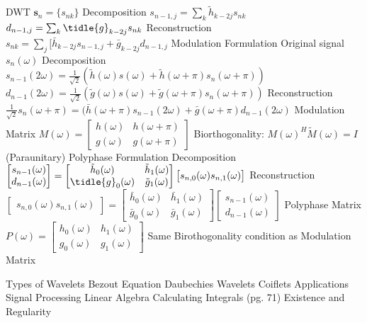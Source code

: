 \documentclass[14pt]{extarticle}
\begin{document}
\begin{outline}
			\2	DWT
				\3	$\mathbf{s}_n = \{s_{nk}\}$
				\3	Decomposition
					\4	$s_{n-1,j} = \sum_k \tilde{h}_{k - 2j} s_{nk}$
					\4	$d_{n-1,j} = \sum_k \tidle{g}_{k - 2j} s_{nk}$
				\3	Reconstruction
					\4	$s_{nk} = \sum_j [\bar{h}_{k - 2j} s_{n-1,j} + \bar{g}_{k-2j}d_{n-1,j}$
			\2	Modulation Formulation
				\3	Original signal $s_n(\omega)$
				\3	Decomposition
					\4	$s_{n-1}(2\omega) = \frac{1}{\sqrt{2}}(\tilde{h}(\omega)s(\omega) + 
								\tilde{h}(\omega + \pi) s_n(\omega + \pi))$
					\4	$d_{n-1}(2\omega) = \frac{1}{\sqrt{2}}(\tilde{g}(\omega)s(\omega) + 
								\tilde{g}(\omega + \pi) s_n(\omega + \pi))$
				\3	Reconstruction
					\4	$\frac{1}{\sqrt{2}}s_n(\omega + \pi) = (\bar{h}(\omega + \pi)s_{n-1}(2\omega) +
								\bar{g}(\omega + \pi) d_{n-1}(2\omega)$
				\3	Modulation Matrix
					\4	$M(\omega) = \begin{bmatrix}
															h(\omega) & h(\omega + \pi) \\
															g(\omega) & g(\omega + \pi)
														\end{bmatrix}$
					\4 Biorthogonality: $M(\omega)^H \tilde{M}(\omega) = I$ (Paraunitary)
			\2	Polyphase Formulation
				\3	Decomposition
					\4	$\begin{bmatrix} s_{n-1}(\omega) \\ d_{n-1}(\omega) \end{bmatrix}
								= \begin{bmatrix}
										\tilde{h}_0(\omega) & \tilde{h}_1(\omega) \\
										\tidle{g}_0(\omega) & \tilde{g}_1(\omega)
									\end{bmatrix}
									\begin{bmatrix}
										s_{n,0}(\omega)
										s_{n,1}(\omega)
									\end{bmatrix}$
				\3	Reconstruction
					\4$		\begin{bmatrix}
										s_{n,0}(\omega)
										s_{n,1}(\omega)
									\end{bmatrix} = 
									\begin{bmatrix}
										\bar{h}_0(\omega) & \bar{h}_1(\omega) \\
										\bar{g}_0(\omega) & \bar{g}_1(\omega)
									\end{bmatrix}		
								\begin{bmatrix} s_{n-1}(\omega) \\ d_{n-1}(\omega) \end{bmatrix}	
						$
				\3	Polyphase Matrix
					\4	$P(\omega) = \begin{bmatrix} 
								h_0(\omega) & h_1(\omega) \\
								g_0(\omega) & g_1(\omega)
							\end{bmatrix}$
					\4	Same Birothogonality condition as Modulation Matrix
	
		\1	Types of Wavelets
			\2	Bezout Equation
			\2	Daubechies Wavelets
			\2	Coiflets
		\1	Applications
			\2	Signal Processing
			\2	Linear Algebra
			\2	Calculating Integrals (pg. 71)
		\1	Existence and Regularity

	\end{outline}
\end{document}
